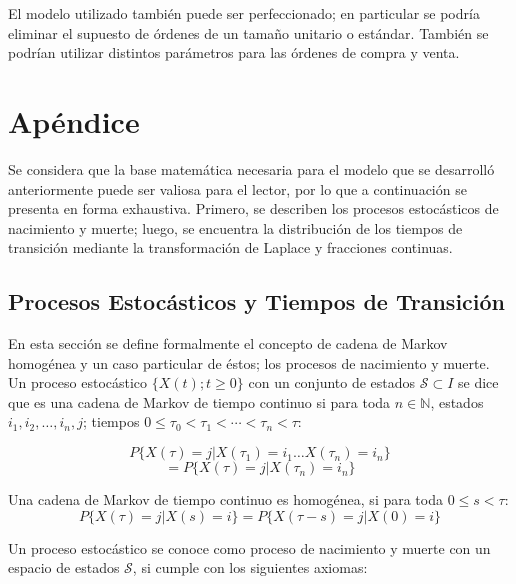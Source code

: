 \documentclass[11pt]{article}
\numberwithin{equation}{section} %
\begin{document}
El modelo utilizado también puede ser perfeccionado; en particular se podría eliminar el supuesto de órdenes de un tamaño unitario o estándar. También se podrían utilizar distintos parámetros para las órdenes de compra y venta.


\clearpage

\appendix
\section{Apéndice} \label{App:AppendixA}

Se considera que la base matemática necesaria para el modelo que se desarrolló anteriormente puede ser valiosa para el lector, por lo que a continuación se presenta en forma exhaustiva. Primero, se describen los procesos estocásticos de nacimiento y muerte; luego, se encuentra la distribución de los tiempos de transición mediante la transformación de Laplace y fracciones continuas.\\

\subsection{Procesos Estocásticos y Tiempos de Transición}

En esta sección se define formalmente el concepto de cadena de Markov homogénea y un caso particular de éstos; los procesos de nacimiento y muerte. Un proceso estocástico $\{X(t);t\geq 0\}$ con un conjunto de estados $\mathcal{S} \subset I$ se dice que es una cadena de Markov de tiempo continuo si para toda $n \in \mathbb{N}$, estados $i_{1},i_{2},\ldots,i_{n},j$; tiempos $0\leq\tau_0<\tau_1<\cdots<\tau_n<\tau$:

\[
P\{X(\tau)=j|X(\tau_1)=i_1\ldots X(\tau_n)=i_n\}
\]
\begin{equation}
= P\{X(\tau)=j|X(\tau_n)=i_n\}
\end{equation}

Una cadena de Markov de tiempo continuo es homogénea, si para toda $0\leq s <\tau$:
\begin{equation}
P\{X(\tau)=j|X(s)=i\}=P\{X(\tau-s)=j|X(0)=i\}
\end{equation}

Un proceso estocástico se conoce como proceso de nacimiento y muerte con un espacio de estados $\mathcal{S}$, si cumple con los siguientes axiomas:
\end{document}
